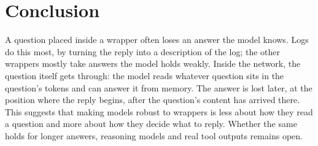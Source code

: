 \section{Conclusion}
\label{sec:conclusion}

A question placed inside a wrapper often loses an answer the model knows. Logs do this most, by turning the reply into a description of the log; the other wrappers mostly take answers the model holds weakly. Inside the network, the question itself gets through: the model reads whatever question sits in the question's tokens and can answer it from memory. The answer is lost later, at the position where the reply begins, after the question's content has arrived there. This suggests that making models robust to wrappers is less about how they read a question and more about how they decide what to reply. Whether the same holds for longer answers, reasoning models and real tool outputs remains open.
